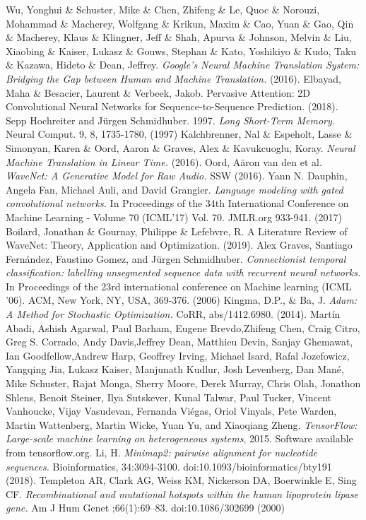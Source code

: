 \documentclass[a4paper,11pt,twoside]{report}
\theoremstyle{definition}
\begin{document}
\begin{thebibliography}{49}
 Wu, Yonghui \& Schuster, Mike \& Chen, Zhifeng \& Le, Quoc \& Norouzi, Mohammad \& Macherey, Wolfgang \& Krikun, Maxim \& Cao, Yuan \& Gao, Qin \& Macherey, Klaus \& Klingner, Jeff \& Shah, Apurva \& Johnson, Melvin \& Liu, Xiaobing \& Kaiser, Lukasz \& Gouws, Stephan \& Kato, Yoshikiyo \& Kudo, Taku \& Kazawa, Hideto \& Dean, Jeffrey. \emph{Google's Neural Machine Translation System: Bridging the Gap between Human and Machine Translation.} (2016).
Elbayad, Maha \& Besacier, Laurent \& Verbeek, Jakob. Pervasive Attention: 2D Convolutional Neural Networks for Sequence-to-Sequence Prediction. (2018).
Sepp Hochreiter and Jürgen Schmidhuber. 1997. \emph{Long Short-Term Memory.} Neural Comput. 9, 8, 1735-1780, (1997)
 Kalchbrenner, Nal \& Espeholt, Lasse \& Simonyan, Karen \& Oord, Aaron \& Graves, Alex \& Kavukcuoglu, Koray. \emph{Neural Machine Translation in Linear Time.} (2016). 
Oord, Aäron van den et al. \emph{WaveNet: A Generative Model for Raw Audio.} SSW (2016).
Yann N. Dauphin, Angela Fan, Michael Auli, and David Grangier. \emph{Language modeling with gated convolutional networks.} In Proceedings of the 34th International Conference on Machine Learning - Volume 70 (ICML'17) Vol. 70. JMLR.org 933-941. (2017)
Boilard, Jonathan \& Gournay, Philippe \& Lefebvre, R. A Literature Review of WaveNet: Theory, Application and Optimization. (2019).
Alex Graves, Santiago Fernández, Faustino Gomez, and Jürgen Schmidhuber. \emph{Connectionist temporal classification: labelling unsegmented sequence data with recurrent neural networks.} In Proceedings of the 23rd international conference on Machine learning (ICML '06). ACM, New York, NY, USA, 369-376. (2006) 
Kingma, D.P., \& Ba, J. \emph{Adam: A Method for Stochastic Optimization.} CoRR, abs/1412.6980. (2014).
Martín Abadi, Ashish Agarwal, Paul Barham, Eugene Brevdo,Zhifeng Chen, Craig Citro, Greg S. Corrado, Andy Davis,Jeffrey Dean, Matthieu Devin, Sanjay Ghemawat, Ian Goodfellow,Andrew Harp, Geoffrey Irving, Michael Isard, Rafal Jozefowicz, Yangqing Jia, Lukasz Kaiser, Manjunath Kudlur, Josh Levenberg, Dan Mané, Mike Schuster, Rajat Monga, Sherry Moore, Derek Murray, Chris Olah, Jonathon Shlens, Benoit Steiner, Ilya Sutskever, Kunal Talwar, Paul Tucker, Vincent Vanhoucke, Vijay Vasudevan, Fernanda Viégas, Oriol Vinyals, Pete Warden, Martin Wattenberg, Martin Wicke, Yuan Yu, and Xiaoqiang Zheng. \emph{TensorFlow: Large-scale machine learning on heterogeneous systems}, 2015. Software available from tensorflow.org.
 Li, H. \emph{Minimap2: pairwise alignment for nucleotide sequences.} Bioinformatics, 34:3094-3100. doi:10.1093/bioinformatics/bty191 (2018).
Templeton AR, Clark AG, Weiss KM, Nickerson DA, Boerwinkle E, Sing CF. \emph{Recombinational and mutational hotspots within the human lipoprotein lipase gene.} Am J Hum Genet ;66(1):69–83. doi:10.1086/302699 (2000)
\end{thebibliography}
\end{document}
